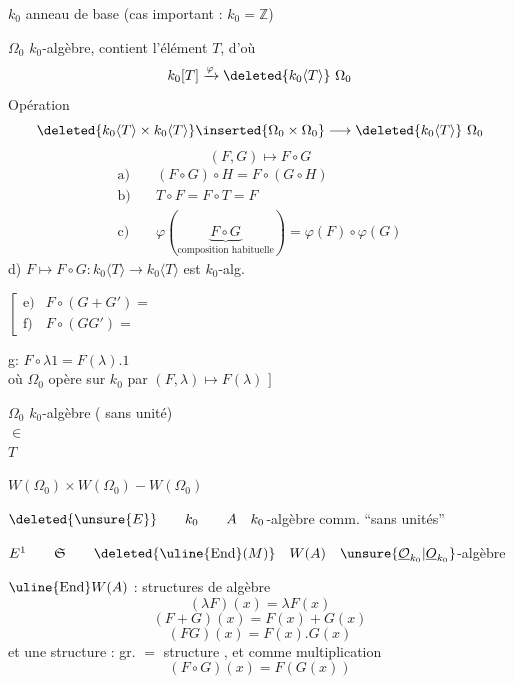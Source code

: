 $k_0$ anneau de base (cas important : $k_0=\mathbb Z$)

$\Omega_0$  $k_0$-algèbre, contient l'élément $T$, d'où
\[
k_0[T]\xrightarrow{\varphi}\deleted{k_0\langle T\rangle}\ \Omega_0
\]
Opération
\[
\deleted{k_0\langle T\rangle\times k_0\langle T\rangle}
\inserted{\Omega_0\times\Omega_0}
\longrightarrow\deleted{k_0\langle T\rangle}\ \Omega_0
\]
\[
(F,G)\longmapsto F\circ G
\]
\begin{align*}
\text{a)}\quad &(F\circ G)\circ H=F\circ(G\circ H)\\
\text{b)}\quad &T\circ F=F\circ T=F\\
\text{c)}\quad &\varphi(\underbrace{F\circ G}_{\text{composition habituelle}})=\varphi(F)\circ\varphi(G)
\end{align*}
d) $F\longmapsto F\circ G:k_0\langle T\rangle\to k_0\langle T\rangle$ est  $k_0$-alg.

$\left[\begin{array}{ll}
\text{e)}&F\circ(G+G')=\\
\text{f)}&F\circ(GG')=
\end{array}\right.$

 g: $F\circ\lambda1=F(\lambda).1$\\
où $\Omega_0$ opère sur $k_0$ par $(F,\lambda)\mapsto F(\lambda)$ $\big]$


$\Omega_0$ $k_0$-algèbre ( sans unité)\\
$\in$\\
$T$

$W(\Omega_0)\times W(\Omega_0)-W(\Omega_0)$

$\deleted{\unsure{E}}\qquad k_0\qquad A\quad k_0$-algèbre comm. ``sans unités''

$E^1\qquad\mathfrak S\qquad\deleted{\uline{\operatorname{End}}(M)}\quad W(A)\quad\unsure{\underline{\mathcal O}_{k_0}|\underline O_{k_0}}$-algèbre

$\uline{\operatorname{End}}W(A)$ :  structures de algèbre
\[
(\lambda F)(x)=\lambda F(x)
\]
\[
(F+G)(x)=F(x)+G(x)
\]
\[
(FG)(x)=F(x).G(x)
\]
et une  structure   : gr. $=$ structure  , et comme multiplication
\[
(F\circ G)(x)=F(G(x))
\]

